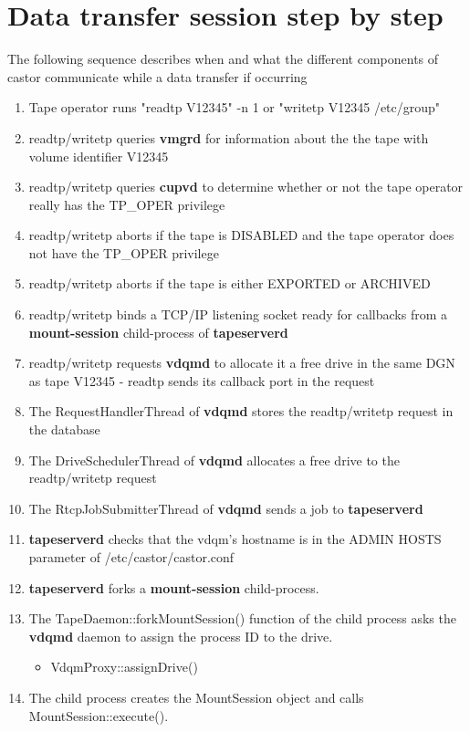 \section{Data transfer session step by step}
The following sequence describes when and what the different components of castor communicate while a  data transfer if occurring 
\begin{enumerate}[noitemsep]
\item Tape operator runs "readtp V12345" -n 1 or "writetp V12345 /etc/group"
\item readtp/writetp queries \textbf{vmgrd} for information about the the tape with volume identifier V12345
\item readtp/writetp queries \textbf{cupvd} to determine whether or not the tape operator really has the TP\_OPER privilege
\item readtp/writetp aborts if the tape is DISABLED and the tape operator does not have the TP\_OPER privilege
\item readtp/writetp aborts if the tape is either EXPORTED or ARCHIVED
\item readtp/writetp binds a TCP/IP listening socket ready for callbacks from a \textbf{mount-session} child-process of \textbf{tapeserverd}
\item readtp/writetp requests \textbf{vdqmd} to allocate it a free drive in the same DGN as tape V12345 - readtp sends its callback port in the request
\item The RequestHandlerThread of \textbf{vdqmd} stores the readtp/writetp request in the database
\item The DriveSchedulerThread of \textbf{vdqmd} allocates a free drive to the readtp/writetp request
\item The RtcpJobSubmitterThread of \textbf{vdqmd} sends a job to \textbf{tapeserverd}
\item \textbf{tapeserverd} checks that the vdqm’s hostname is in the ADMIN HOSTS parameter of /etc/castor/castor.conf
\item \textbf{tapeserverd} forks a \textbf{mount-session} child-process.
\item The TapeDaemon::forkMountSession() function of the child process asks the \textbf{vdqmd} daemon to assign the process ID to the drive.
\begin{itemize}
\item        VdqmProxy::assignDrive()
\end{itemize}
\item The child process creates the MountSession object and calls MountSession::execute().

\end{enumerate}
